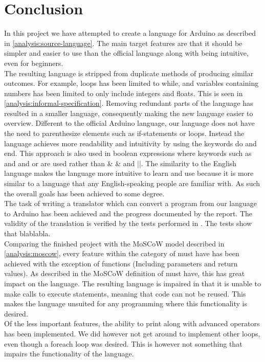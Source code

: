 \section{Conclusion}

In this project we have attempted to create a language for Arduino as described in \ref{analysis:source-language}. The main target features are that it should be simpler and easier to use than the official language along with being intuitive, even for beginners. \\
The resulting language is stripped from duplicate methods of producing similar outcomes. For example, loops has been limited to while, and variables containing numbers has been limited to only include integers and floats. This is seen in \ref{analysis:informal-specification}. Removing redundant parts of the language has resulted in a smaller language, consequently making the new language easier to overview. Different to the official Arduino language, our language does not have the need to parenthesize elements such as if-statements or loops. Instead the language achieves more readability and intuitivity by using the keywords do and end. This approach is also used in boolean expressions where keywords such as and and or are used rather than \& \& and  ||. The similarity to the English language makes the language more intuitive to learn and use because it is more similar to a language that any English-speaking people are familiar with. As such the overall goals has been achieved to some degree. \\
The task of writing a translator which can convert a program from our language to Arduino has been achieved and the progress documented by the report. The validity of the translation is verified by the tests performed in . The tests show that blablabla. \\
Comparing the finished project with the MoSCoW model described in \ref{analysis:moscow}, every feature within the category of must have has been achieved with the exception of functions (Including parameters and return values). As described in the MoSCoW definition of must have, this has great impact on the language. The resulting language is impaired in that it is unable to make calls to execute statements, meaning that code can not be reused. This makes the language unsuited for any programming where this functionality is desired. \\
Of the less important features, the ability to print along with advanced operators has been implemented. We did however not get around to implement other loops, even though a foreach loop was desired. This is however not something that impairs the functionality of the language.  \\

